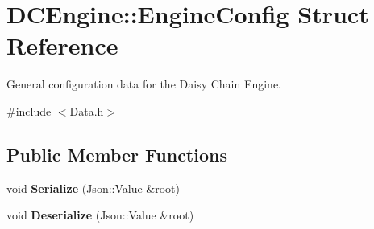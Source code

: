 \hypertarget{structDCEngine_1_1EngineConfig}{\section{D\-C\-Engine\-:\-:Engine\-Config Struct Reference}
\label{structDCEngine_1_1EngineConfig}
}


General configuration data for the Daisy Chain Engine.  




{\ttfamily \#include $<$Data.\-h$>$}

\subsection*{Public Member Functions}
\begin{DoxyCompactItemize}
\item 
\hypertarget{structDCEngine_1_1EngineConfig_a474af02860db77d5bf1db611c0c55270}{void {\bfseries Serialize} (Json\-::\-Value \&root)}\label{structDCEngine_1_1EngineConfig_a474af02860db77d5bf1db611c0c55270}

\item 
\hypertarget{structDCEngine_1_1EngineConfig_aba5ce7e03eb0cb9211ee29f2fd10d78a}{void {\bfseries Deserialize} (Json\-::\-Value \&root)}\label{structDCEngine_1_1EngineConfig_aba5ce7e03eb0cb9211ee29f2fd10d78a}

\end{DoxyCompactItemize}
